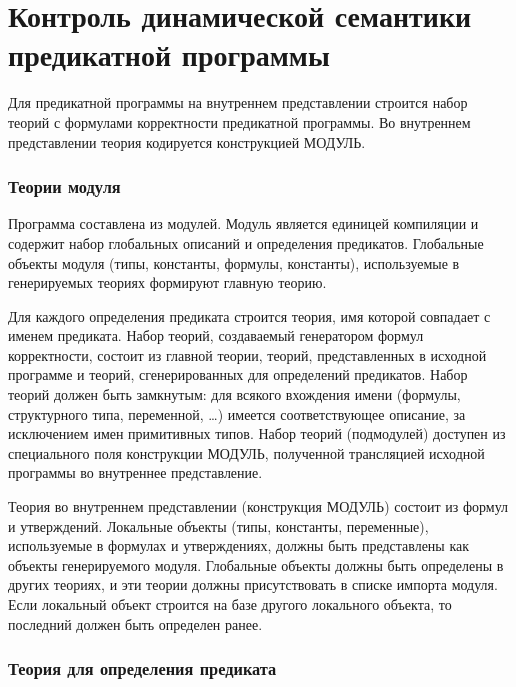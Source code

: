 \documentclass[12pt,a4paper]{article}
\begin{document}

\lstset{language=P}

\part*{Контроль динамической семантики предикатной программы}

Для предикатной программы на внутреннем представлении строится набор теорий с формулами корректности предикатной программы. Во внутреннем представлении теория кодируется конструкцией МОДУЛЬ.

\section{Теории модуля}

Программа составлена из модулей. Модуль является единицей компиляции и содержит набор глобальных описаний и определения предикатов. Глобальные объекты модуля (типы, константы, формулы, константы), используемые в генерируемых теориях формируют главную теорию.

Для каждого определения предиката строится теория, имя которой совпадает с именем предиката. Набор теорий, создаваемый генератором формул корректности, состоит из главной теории, теорий, представленных в исходной программе и теорий, сгенерированных для определений предикатов. Набор теорий должен быть замкнутым: для всякого вхождения имени (формулы, структурного типа, переменной, \dots) имеется соответствующее описание, за исключением имен примитивных типов. Набор теорий (подмодулей) доступен из специального поля конструкции МОДУЛЬ, полученной трансляцией исходной программы во внутреннее представление.

Теория во внутреннем представлении (конструкция МОДУЛЬ) состоит из формул и утверждений. Локальные объекты (типы, константы, переменные), используемые в формулах и утверждениях, должны быть представлены как объекты генерируемого модуля. Глобальные объекты должны быть определены в других теориях, и эти теории должны присутствовать в списке импорта модуля. Если локальный объект строится на базе другого локального объекта, то последний должен быть определен ранее.

\section{Теория для определения предиката}
\end{document}
